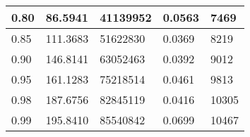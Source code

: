 \begin{tabular}{|l|l|l|l|l|}
 0.80 &               86.5941 &          41139952 &         0.0563 &             7469 \\ \hline

 0.85 &              111.3683 &          51622830 &         0.0369 &             8219 \\ \hline

 0.90 &              146.8141 &          63052463 &         0.0392 &             9012 \\ \hline

 0.95 &              161.1283 &          75218514 &         0.0461 &             9813 \\ \hline

 0.98 &              187.6756 &          82845119 &         0.0416 &            10305 \\ \hline

 0.99 &              195.8410 &          85540842 &         0.0699 &            10467 \\ \hline

\bottomrule
\end{tabular}
